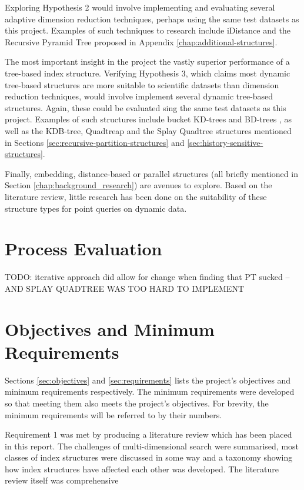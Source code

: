 Exploring Hypothesis 2 would involve implementing and evaluating several adaptive dimension reduction techniques, perhaps using the same test datasets as this project. Examples of such techniques to research include iDistance \cite{idistance} and the Recursive Pyramid Tree proposed in Appendix \ref{chap:additional-structures}.

The most important insight in the project the vastly superior performance of a tree-based index structure. Verifying Hypothesis 3, which claims most dynamic tree-based structures are more suitable to scientific datasets than dimension reduction techniques, would involve implement several dynamic tree-based structures. Again, these could be evaluated sing the same test datasets as this project. Examples of such structures include bucket KD-trees and BD-trees \cite{kdtree-v-bdtree}, as well as the KDB-tree, Quadtreap and the Splay Quadtree structures mentioned in Sections \ref{sec:recursive-partition-structures} and \ref{sec:history-sensitive-structures}.

Finally, embedding, distance-based or parallel structures (all briefly mentioned in Section \ref{chap:background_research}) are avenues to explore. Based on the literature review, little research has been done on the suitability of these structure types for point queries on dynamic data.

\section{Process Evaluation}

TODO: iterative approach did allow for change when finding that PT sucked -- AND SPLAY QUADTREE WAS TOO HARD TO IMPLEMENT

\section{Objectives and Minimum Requirements}

Sections \ref{sec:objectives} and \ref{sec:requirements} lists the project's objectives and minimum requirements respectively. The minimum requirements were developed so that meeting them also meets the project's objectives. For brevity, the minimum requirements will be referred to by their numbers.

Requirement 1 was met by producing a literature review which has been placed in this report. The challenges of multi-dimensional search were summarised, most classes of index structures were discussed in some way and a taxonomy showing how index structures have affected each other was developed. The literature review itself was comprehensive

